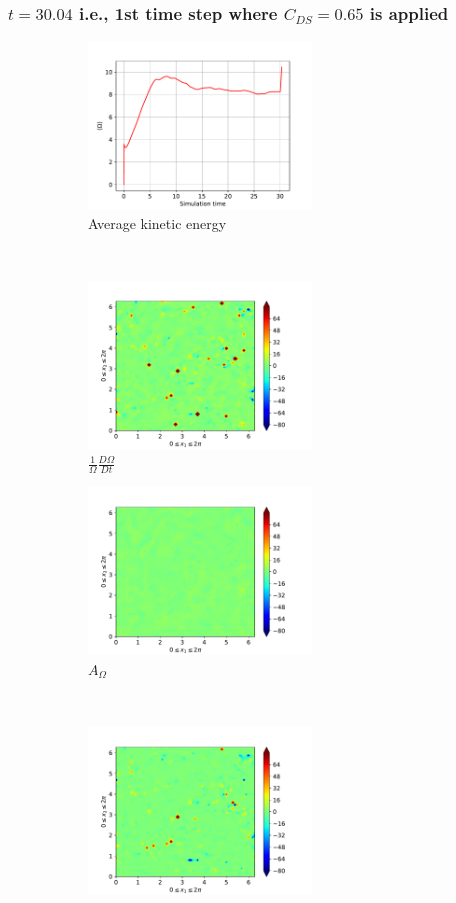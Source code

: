 \subsubsection{$t=30.04$ i.e., 1st time step where $C_{DS}=0.65$ is applied} 
\begin{figure}[H]
    \begin{subfigure}[H]{0.45\textwidth}
        \includegraphics[height=1.75in]{media/run-cds-65/enst-average1360}
        \caption{Average kinetic energy}
    \end{subfigure}
    ~
    \begin{subfigure}[H]{0.45\textwidth}
        \includegraphics[height=1.75in]{media/run-cds-65/enst-1360}
        \caption{$\frac{1}{\Omega} \frac{D \Omega}{Dt}$}
    \end{subfigure}
    \newline
    \begin{subfigure}{0.45\textwidth}
        \includegraphics[height=1.75in]{media/run-cds-65/A-enst-1360}
        \caption{$A_{\Omega}$}
    \end{subfigure}
    ~
    \begin{subfigure}{0.45\textwidth}
        \includegraphics[height=1.75in]{media/run-cds-65/Pi-enst-1360}

\end{subfigure}
\end{figure}
